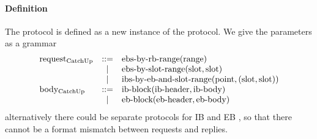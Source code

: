 \paragraph{Definition} The \catchup{} protocol is defined as a new instance of the \fetch{} protocol. We give the parameters as a grammar
\[
\begin{array}{l c l l}
\text{request}{}_{\text{CatchUp}{}} & ::= & \text{ebs-by-rb-range}(\text{range}{})\\
       & \mid  & \text{ebs-by-slot-range}(\text{slot}{},\text{slot}{})\\
       & \mid  & \text{ibs-by-eb-and-slot-range}(\text{point}{},(\text{slot}{},\text{slot}{}))\\
\text{body}{}_{\text{CatchUp}{}} & ::= & \text{ib-block}(\text{ib-header},\text{ib-body}) \\
        & \mid & \text{eb-block}(\text{eb-header}, \text{eb-body})\\
\end{array}
\]
alternatively there could be separate protocols for IB and EB \catchup{}, so that there cannot be a format mismatch between requests and replies.
